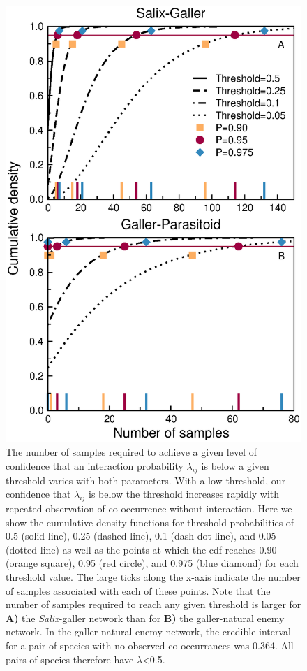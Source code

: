 \documentclass[12pt]{article}
\begin{document}
      \begin{figure}[ht]
        \caption{The number of samples required to achieve a given level of confidence that an interaction probability $\lambda_{ij}$ is below a given threshold varies with both parameters. With a low threshold, our confidence that $\lambda_{ij}$ is below the threshold increases rapidly with repeated observation of co-occurrence without interaction. Here we show the cumulative density functions for threshold probabilities of 0.5 (solid line), 0.25 (dashed line), 0.1 (dash-dot line), and 0.05 (dotted line) as well as the points at which the cdf reaches 0.90 (orange square), 0.95 (red circle), and 0.975 (blue diamond) for each threshold value. The large ticks along the x-axis indicate the number of samples associated with each of these points. Note that the number of samples required to reach any given threshold is larger for \textbf{A)} the \emph{Salix}-galler network than for \textbf{B)} the galler-natural enemy network. In the galler-natural enemy network, the credible interval for a pair of species with no observed co-occurrances was 0.364. All pairs of species therefore have $\lambda$\textless0.5.}
        \label{Salix_cdfs}
        \includegraphics[width=.8\textwidth]{figures/Salix_Galler_samples_and_cdfs.eps}

        \end{figure}
\end{document}
